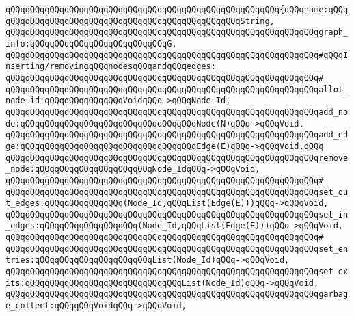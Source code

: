 \verb|qQQqqQQqqQQqqQQqqQQqqQQqqQQqqQQqqQQqqQQqqQQqqQQqqQQqqQQq{qQQqname:qQQqqQQqqQQqqQQqqQQqqQQqqQQqqQQqqQQqqQQqqQQqqQQqqQQqString,|\newline
\verb|qQQqqQQqqQQqqQQqqQQqqQQqqQQqqQQqqQQqqQQqqQQqqQQqqQQqqQQqqQQqqQQqgraph_info:qQQqqQQqqQQqqQQqqQQqqQQqqQQqG,|\newline
\newline
\verb|qQQqqQQqqQQqqQQqqQQqqQQqqQQqqQQqqQQqqQQqqQQqqQQqqQQqqQQqqQQqqQQq#qQQqInserting/removingqQQqnodesqQQqandqQQqedges:|\newline
\verb|qQQqqQQqqQQqqQQqqQQqqQQqqQQqqQQqqQQqqQQqqQQqqQQqqQQqqQQqqQQqqQQq#|\newline
\verb|qQQqqQQqqQQqqQQqqQQqqQQqqQQqqQQqqQQqqQQqqQQqqQQqqQQqqQQqqQQqqQQqallot_node_id:qQQqqQQqqQQqqQQqVoidqQQq->qQQqNode_Id,|\newline
\verb|qQQqqQQqqQQqqQQqqQQqqQQqqQQqqQQqqQQqqQQqqQQqqQQqqQQqqQQqqQQqqQQqadd_node:qQQqqQQqqQQqqQQqqQQqqQQqqQQqqQQqqQQqNode(N)qQQq->qQQqVoid,|\newline
\verb|qQQqqQQqqQQqqQQqqQQqqQQqqQQqqQQqqQQqqQQqqQQqqQQqqQQqqQQqqQQqqQQqadd_edge:qQQqqQQqqQQqqQQqqQQqqQQqqQQqqQQqqQQqEdge(E)qQQq->qQQqVoid,qQQq|\newline
\verb|qQQqqQQqqQQqqQQqqQQqqQQqqQQqqQQqqQQqqQQqqQQqqQQqqQQqqQQqqQQqqQQqremove_node:qQQqqQQqqQQqqQQqqQQqqQQqNode_IdqQQq->qQQqVoid,|\newline
\verb|qQQqqQQqqQQqqQQqqQQqqQQqqQQqqQQqqQQqqQQqqQQqqQQqqQQqqQQqqQQqqQQq#|\newline
\verb|qQQqqQQqqQQqqQQqqQQqqQQqqQQqqQQqqQQqqQQqqQQqqQQqqQQqqQQqqQQqqQQqset_out_edges:qQQqqQQqqQQqqQQq(Node_Id,qQQqList(Edge(E)))qQQq->qQQqVoid,|\newline
\verb|qQQqqQQqqQQqqQQqqQQqqQQqqQQqqQQqqQQqqQQqqQQqqQQqqQQqqQQqqQQqqQQqset_in_edges:qQQqqQQqqQQqqQQqqQQq(Node_Id,qQQqList(Edge(E)))qQQq->qQQqVoid,|\newline
\verb|qQQqqQQqqQQqqQQqqQQqqQQqqQQqqQQqqQQqqQQqqQQqqQQqqQQqqQQqqQQqqQQq#|\newline
\verb|qQQqqQQqqQQqqQQqqQQqqQQqqQQqqQQqqQQqqQQqqQQqqQQqqQQqqQQqqQQqqQQqset_entries:qQQqqQQqqQQqqQQqqQQqqQQqList(Node_Id)qQQq->qQQqVoid,|\newline
\verb|qQQqqQQqqQQqqQQqqQQqqQQqqQQqqQQqqQQqqQQqqQQqqQQqqQQqqQQqqQQqqQQqset_exits:qQQqqQQqqQQqqQQqqQQqqQQqqQQqqQQqList(Node_Id)qQQq->qQQqVoid,|\newline
\newline
\verb|qQQqqQQqqQQqqQQqqQQqqQQqqQQqqQQqqQQqqQQqqQQqqQQqqQQqqQQqqQQqqQQqgarbage_collect:qQQqqQQqVoidqQQq->qQQqVoid,|\newline
